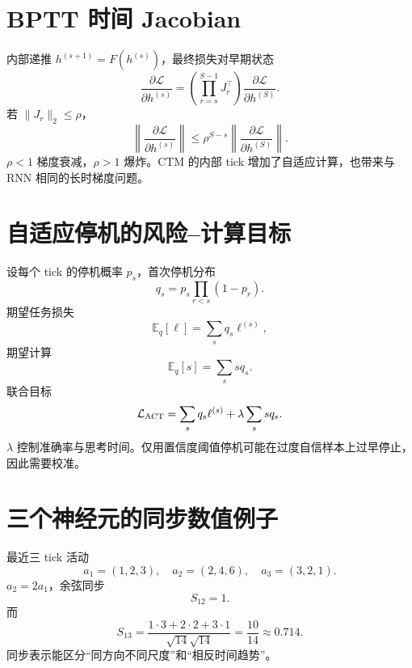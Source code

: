 \documentclass[UTF8,12pt,a4paper,fontset=none]{ctexart}
\numberwithin{equation}{section}
\newcommand{\E}{\mathbb{E}}
\newcommand{\Loss}{\mathcal{L}}
\begin{document}
\section{BPTT 时间 Jacobian}
内部递推 $h^{(s+1)}=F(h^{(s)})$，最终损失对早期状态
\begin{equation}
 \frac{\partial\Loss}{\partial h^{(s)}}
 =\left(\prod_{r=s}^{S-1}J_r^\top\right)
 \frac{\partial\Loss}{\partial h^{(S)}}.
\end{equation}
若 $\|J_r\|_2\le\rho$，
\begin{equation}
 \left\|\frac{\partial\Loss}{\partial h^{(s)}}\right\|
 \le\rho^{S-s}
 \left\|\frac{\partial\Loss}{\partial h^{(S)}}\right\|.
\end{equation}
$\rho<1$ 梯度衰减，$\rho>1$ 爆炸。CTM 的内部 tick 增加了自适应计算，也带来与 RNN 相同的长时梯度问题。

\section{自适应停机的风险--计算目标}
设每个 tick 的停机概率 $p_s$，首次停机分布
\begin{equation}
 q_s=p_s\prod_{r<s}(1-p_r).
\end{equation}
期望任务损失
\begin{equation}
 \E_q[\ell]=\sum_sq_s\ell^{(s)},
\end{equation}
期望计算
\begin{equation}
 \E_q[s]=\sum_ssq_s.
\end{equation}
联合目标
\begin{equation}
 \Loss_{\rm ACT}=\sum_sq_s\ell^{(s)}+
 \lambda\sum_ssq_s.
\end{equation}
$\lambda$ 控制准确率与思考时间。仅用置信度阈值停机可能在过度自信样本上过早停止，因此需要校准。

\section{三个神经元的同步数值例子}
最近三 tick 活动
\begin{equation}
 a_1=(1,2,3),\quad
 a_2=(2,4,6),\quad
 a_3=(3,2,1).
\end{equation}
$a_2=2a_1$，余弦同步
\begin{equation}
 S_{12}=1.
\end{equation}
而
\begin{equation}
 S_{13}=\frac{1\cdot3+2\cdot2+3\cdot1}
 {\sqrt{14}\sqrt{14}}=\frac{10}{14}\approx0.714.
\end{equation}
同步表示能区分“同方向不同尺度”和“相反时间趋势”。
\end{document}
